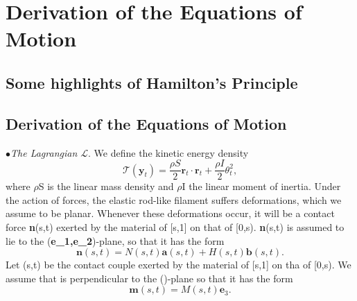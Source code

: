 \documentclass[12pt]{article}
\begin{document}
\section{Derivation of the Equations of Motion
}\label{Derivation of the Equations of Motion
}
\subsection{Some highlights of Hamilton's Principle}
\subsection{Derivation of the Equations of Motion}
$\bullet$\emph{The Lagrangian $\mathcal{L}$}. We define the kinetic energy density 
\[ \mathcal{T}(\mathbf{y}_t) = \frac{\rho S}{2} \mathbf{r}_t \cdot \mathbf{r}_t + \frac{\rho I}{2}\theta_t ^2,
\]
where $\rho$S is the linear mass density and $\rho$I the linear moment of inertia.
Under the action of forces, the elastic rod-like filament suffers deformations, which we assume to be planar. Whenever these deformations occur, it will be a contact force \textbf{n}(s,t) exerted by the material of [s,1] on that of [0,s). \textbf{n}(s,t) is assumed to lie to the (\textbf{e_1,e_2})-plane, so that it has the form
\[  \mathbf{n}(s,t)= N(s,t) \mathbf{a}(s,t) + H(s,t)\mathbf{b} (s,t).
\]
Let (s,t) be the contact couple exerted by the material of [s,1] on tha of [0,s). We assume that  is perpendicular to the ()-plane so that it has the form
\[ 
\mathbf{m}(s,t) = M(s,t)\mathbf{e}_3.
\]
\end{document}
